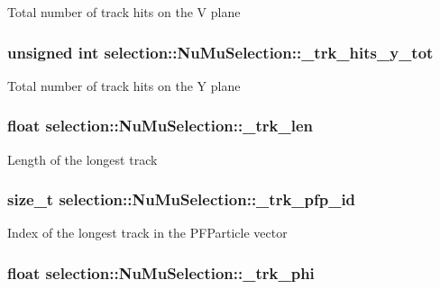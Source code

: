Total number of track hits on the V plane \hypertarget{classselection_1_1NuMuSelection_a7c0ae4ea16390adf8803846578ad2d05}{
\subsubsection[{\-\_\-trk\-\_\-hits\-\_\-y\-\_\-tot}]{\setlength{\rightskip}{0pt plus 5cm}unsigned int selection\-::\-Nu\-Mu\-Selection\-::\-\_\-trk\-\_\-hits\-\_\-y\-\_\-tot\hspace{0.3cm}{\ttfamily [private]}}}\label{classselection_1_1NuMuSelection_a7c0ae4ea16390adf8803846578ad2d05}
Total number of track hits on the Y plane \hypertarget{classselection_1_1NuMuSelection_ab8df38bd822646f56b672b4f942930a3}{
\subsubsection[{\-\_\-trk\-\_\-len}]{\setlength{\rightskip}{0pt plus 5cm}float selection\-::\-Nu\-Mu\-Selection\-::\-\_\-trk\-\_\-len\hspace{0.3cm}{\ttfamily [private]}}}\label{classselection_1_1NuMuSelection_ab8df38bd822646f56b672b4f942930a3}
Length of the longest track \hypertarget{classselection_1_1NuMuSelection_acbc163e95eec5a3bbbf3648480737a56}{
\subsubsection[{\-\_\-trk\-\_\-pfp\-\_\-id}]{\setlength{\rightskip}{0pt plus 5cm}size\-\_\-t selection\-::\-Nu\-Mu\-Selection\-::\-\_\-trk\-\_\-pfp\-\_\-id\hspace{0.3cm}{\ttfamily [private]}}}\label{classselection_1_1NuMuSelection_acbc163e95eec5a3bbbf3648480737a56}
Index of the longest track in the P\-F\-Particle vector \hypertarget{classselection_1_1NuMuSelection_aeb0b180b3bbe753b576c4db2fa3f94af}{
\subsubsection[{\-\_\-trk\-\_\-phi}]{\setlength{\rightskip}{0pt plus 5cm}float selection\-::\-Nu\-Mu\-Selection\-::\-\_\-trk\-\_\-phi\hspace{0.3cm}{\ttfamily [private]}}}\label{classselection_1_1NuMuSelection_aeb0b180b3bbe753b576c4db2fa3f94af}
